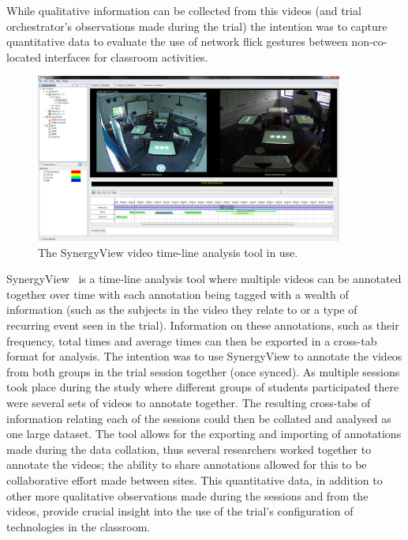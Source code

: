 \documentclass[twocolumn]{svjour3}          %
\begin{document}

While qualitative information can be collected from this videos (and trial orchestrator's observations made during the trial) the intention was to capture quantitative data to evaluate the use of network flick gestures between non-co-located interfaces for classroom activities.

\begin{figure}[h]
 \centering
   \includegraphics[width=0.9\textwidth]{figures/synergyviewexample.png}
   \caption{The SynergyView video time-line analysis tool in use.}
   \label{fig:SynergyviewExample}
\end{figure}

SynergyView~\citep{kyaw:2010} is a time-line analysis tool where multiple videos can be annotated together over time with each annotation being tagged with a wealth of information (such as the subjects in the video they relate to or a type of recurring event seen in the trial).
Information on these annotations, such as their frequency, total times and average times can then be exported in a cross-tab format for analysis.
The intention was to use SynergyView to annotate the videos from both groups in the trial session together (once synced).
As multiple sessions took place during the study where different groups of students participated there were several sets of videos to annotate together.
The resulting cross-tabs of information relating each of the sessions could then be collated and analysed as one large dataset.
The tool allows for the exporting and importing of annotations made during the data collation, thus several researchers worked together to annotate the videos; the ability to share annotations allowed for this to be collaborative effort made between sites. 
This quantitative data, in addition to other more qualitative observations made during the sessions and from the videos, provide crucial insight into the use of the trial's configuration of technologies in the classroom.
\end{document}
